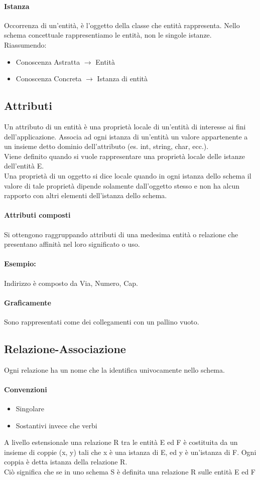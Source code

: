 \paragraph*{Istanza}
Occorrenza di un'entità, è l'oggetto della classe che entità rappresenta. Nello schema
concettuale rappresentiamo le entità, non le singole istanze.
\\ Riassumendo:
\begin{itemize}
    \item Conoscenza Astratta $\rightarrow$ Entità
    \item Conoscenza Concreta $\rightarrow$ Istanza di entità
\end{itemize}
\subsection*{Attributi}
Un attributo di un entità è una proprietà locale di un'entità di interesse ai
fini dell'applicazione. Associa ad ogni istanza di un'entità un valore appartenente
a un insieme detto dominio dell'attributo (es. int, string, char, ecc.).
\\ Viene definito quando si vuole rappresentare una proprietà locale
delle istanze dell'entità E.
\\ Una proprietà di un oggetto si dice locale quando in ogni istanza dello schema il valore
di tale proprietà dipende solamente dall'oggetto stesso e non ha alcun rapporto
con altri elementi dell'istanza dello schema.
\paragraph*{Attributi composti}
Si ottengono raggruppando attributi di una medesima entità o relazione che
presentano affinità nel loro significato o uso.
\paragraph*{Esempio:} Indirizzo è composto da Via, Numero, Cap.
\paragraph*{Graficamente} Sono rappresentati come dei collegamenti con un pallino vuoto.
\subsection*{Relazione-Associazione}
Ogni relazione ha un nome che la identifica univocamente nello schema.
\paragraph*{Convenzioni}
\begin{itemize}
    \item Singolare
    \item Sostantivi invece che verbi
\end{itemize}
A livello estensionale una relazione R tra le entità E ed F è costituita da un
insieme di coppie (x, y) tali che x è una istanza di E, ed y è un'istanza di F.
Ogni coppia è detta istanza della relazione R.
\\ Ciò significa che se in uno schema S è definita una relazione R sulle entità E ed F
